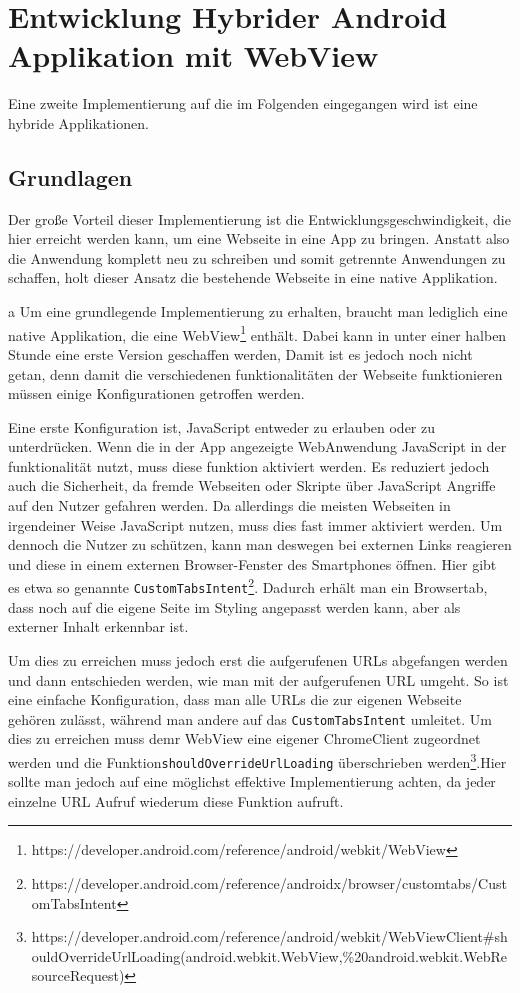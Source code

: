 \section{Entwicklung Hybrider Android Applikation mit WebView}

Eine zweite Implementierung auf die im Folgenden eingegangen wird ist eine hybride Applikationen. 

\subsection{Grundlagen}
Der große Vorteil dieser Implementierung ist die Entwicklungsgeschwindigkeit, die hier erreicht werden kann, um eine Webseite in eine App zu bringen. Anstatt also die Anwendung komplett neu zu schreiben und somit getrennte Anwendungen zu schaffen, holt dieser Ansatz die bestehende Webseite in eine native Applikation. 

a
Um eine grundlegende Implementierung zu erhalten, braucht man lediglich eine native Applikation, die eine WebView\footnote{https://developer.android.com/reference/android/webkit/WebView} enthält. Dabei kann in unter einer halben Stunde eine erste Version geschaffen werden,
Damit ist es jedoch noch nicht getan, denn damit die verschiedenen funktionalitäten der Webseite funktionieren müssen einige Konfigurationen getroffen werden.

Eine erste Konfiguration ist, JavaScript entweder zu erlauben oder zu unterdrücken. Wenn die in der App angezeigte WebAnwendung JavaScript in der funktionalität nutzt, muss diese funktion aktiviert werden. Es reduziert jedoch auch die Sicherheit, da fremde Webseiten oder Skripte über JavaScript Angriffe auf den Nutzer gefahren werden. Da allerdings die meisten Webseiten in irgendeiner Weise JavaScript nutzen, muss dies fast immer aktiviert werden. Um dennoch die Nutzer zu schützen, kann man deswegen bei externen Links reagieren und diese in einem externen Browser-Fenster des Smartphones öffnen. Hier gibt es etwa so genannte \verb|CustomTabsIntent|\footnote{https://developer.android.com/reference/androidx/browser/customtabs/CustomTabsIntent}. Dadurch erhält man ein Browsertab, dass noch auf die eigene Seite im Styling angepasst werden kann, aber als externer Inhalt erkennbar ist.

Um dies zu erreichen muss jedoch erst die aufgerufenen URLs abgefangen werden und dann entschieden werden, wie man mit der aufgerufenen URL umgeht. So ist eine einfache Konfiguration, dass man alle URLs die zur eigenen Webseite gehören zulässt, während man andere auf das \verb|CustomTabsIntent| umleitet. Um dies zu erreichen muss demr WebView eine eigener ChromeClient zugeordnet werden und die Funktion\verb|shouldOverrideUrlLoading| überschrieben werden\footnote{https://developer.android.com/reference/android/webkit/WebViewClient\#shouldOverrideUrlLoading(android.webkit.WebView,\%20android.webkit.WebResourceRequest)}.Hier sollte man jedoch auf eine möglichst effektive Implementierung achten, da jeder einzelne URL Aufruf wiederum diese Funktion aufruft.

